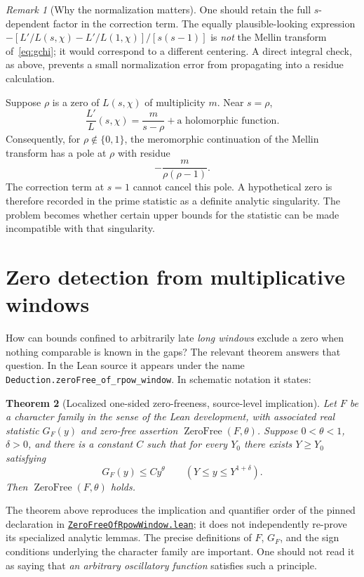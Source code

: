 \documentclass[11pt,openany,oneside]{scrbook}
\newtheorem{theorem}{Theorem}[chapter]
\theoremstyle{definition}
\theoremstyle{remark}
\newtheorem{remark}[theorem]{Remark}
\newcommand{\baseurl}{https://github.com/CocoSgt/riemann-hypothesis-lean/blob/7cbf7a0c32fca1badf05931879a37c3f8a2b03b4/}
\newcommand{\sourcefile}[2]{\href{\baseurl#1}{\texttt{#2}}}
\begin{document}
\begin{remark}[Why the normalization matters]
One should retain the full $s$-dependent factor in the correction term. The equally plausible-looking expression
$-[L'/L(s,\chi)-L'/L(1,\chi)]/[s(s-1)]$ is \emph{not} the Mellin transform of~\eqref{eq:gchi}; it would correspond to a different centering. A direct integral check, as above, prevents a small normalization error from propagating into a residue calculation.
\end{remark}

Suppose $\rho$ is a zero of $L(s,\chi)$ of multiplicity $m$. Near $s=\rho$,
\[
\frac{L'}{L}(s,\chi)=\frac{m}{s-\rho}+\text{a holomorphic function}.
\]
Consequently, for $\rho\notin\{0,1\}$, the meromorphic continuation of the Mellin transform has a pole at $\rho$ with residue
\begin{equation}\label{eq:residue}
-\frac{m}{\rho(\rho-1)}.
\end{equation}
The correction term at $s=1$ cannot cancel this pole. A hypothetical zero is therefore recorded in the prime statistic as a definite analytic singularity. The problem becomes whether certain upper bounds for the statistic can be made incompatible with that singularity.

\section{Zero detection from multiplicative windows}

How can bounds confined to arbitrarily late \emph{long windows} exclude a zero when nothing comparable is known in the gaps? The relevant theorem answers that question. In the Lean source it appears under the name
\texttt{Deduction.zeroFree\_of\_rpow\_window}. In schematic notation it states:
\begin{theorem}[Localized one-sided zero-freeness, source-level implication]\label{thm:window}
Let $F$ be a character family in the sense of the Lean development, with associated real statistic $G_F(y)$ and zero-free assertion $\operatorname{ZeroFree}(F,\theta)$. Suppose $0<\theta<1$, $\delta>0$, and there is a constant $C$ such that for every $Y_0$ there exists $Y\ge Y_0$ satisfying
\begin{equation}\label{eq:window}
G_F(y)\le C y^\theta
\qquad (Y\le y\le Y^{1+\delta}).
\end{equation}
Then $\operatorname{ZeroFree}(F,\theta)$ holds.
\end{theorem}
The theorem above reproduces the implication and quantifier order of the pinned declaration in
\sourcefile{src/Development/AutomorphicArithmetic/DedekindLFunctions/LandauTheorems/ZeroFreeOfRpowWindow.lean}{ZeroFreeOfRpowWindow.lean}; it does not independently re-prove its specialized analytic lemmas. The precise definitions of $F$, $G_F$, and the sign conditions underlying the character family are important. One should not read it as saying that \emph{an arbitrary oscillatory function} satisfies such a principle.
\end{document}
